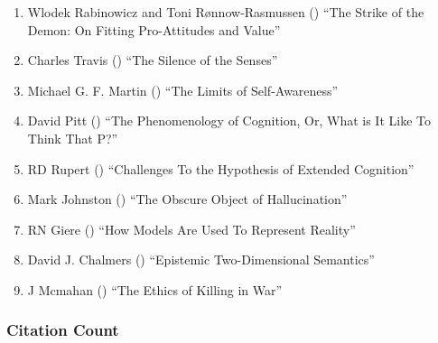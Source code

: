 \documentclass[
  10pt,
  letterpaper,
  DIV=11,
  numbers=noendperiod,
  twoside]{scrartcl}
\providecommand{\tightlist}{%
  \setlength{\itemsep}{0pt}\setlength{\parskip}{0pt}}\usepackage{longtable,booktabs,array}
\begin{document}
\begin{enumerate}
\def\labelenumi{\arabic{enumi}.}
\tightlist
\item
  Wlodek Rabinowicz and Toni Rønnow‐Rasmussen
  () ``The Strike of the Demon:
  On Fitting Pro-Attitudes and Value''
\item
  Charles Travis () ``The Silence
  of the Senses''
\item
  Michael G. F. Martin () ``The
  Limits of Self-Awareness''
\item
  David Pitt () ``The
  Phenomenology of Cognition, Or, What is It Like To Think That P?''
\item
  RD Rupert () ``Challenges To
  the Hypothesis of Extended Cognition''
\item
  Mark Johnston () ``The Obscure
  Object of Hallucination''
\item
  RN Giere () ``How Models Are
  Used To Represent Reality''
\item
  David J. Chalmers ()
  ``Epistemic Two-Dimensional Semantics''
\item
  J Mcmahan () ``The Ethics of
  Killing in War''
\end{enumerate}

\subsubsection*{Citation Count}\label{sec-count-2004}
\end{document}
